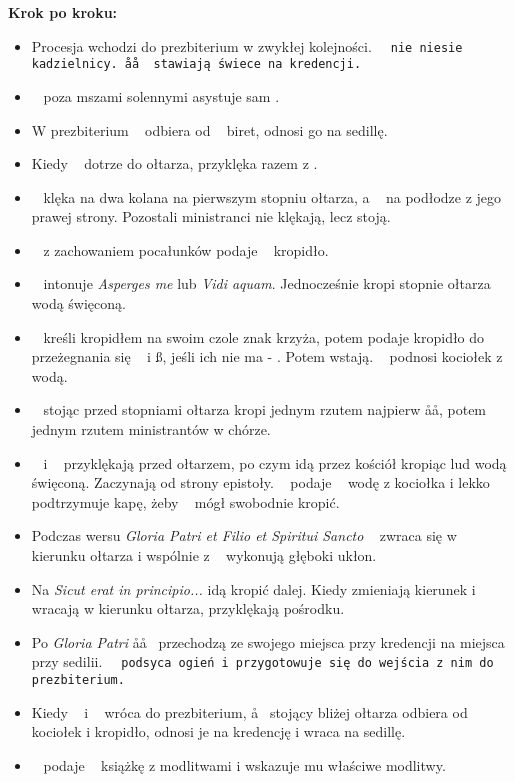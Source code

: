 \textbf{Krok po kroku:}
\begin{itemize}
	\item Procesja wchodzi do prezbiterium w zwykłej kolejności. \tt~ nie niesie
	      kadzielnicy. \aa\aa~ stawiają świece na kredencji.
	\item \ii~ poza mszami solennymi asystuje sam \cc.
	\item W prezbiterium \cc~ odbiera od \ii~ biret, odnosi go na sedillę.
	\item Kiedy \ii~ dotrze do ołtarza, przyklęka razem z \cc.
	\item \ii~ klęka na dwa kolana na pierwszym stopniu ołtarza, a \cc~ na
	      podłodze z jego prawej strony. Pozostali ministranci nie klękają, lecz
	      stoją.
	\item \cc~ z zachowaniem pocałunków podaje \ii~ kropidło.
	\item \ii~ intonuje \textit{Asperges me} lub \textit{Vidi aquam}.
	      Jednocześnie kropi stopnie ołtarza wodą święconą.
	\item \ii~ kreśli kropidłem na swoim czole znak krzyża, potem podaje
	      kropidło do przeżegnania się \dd~ i \ss, jeśli ich nie ma - \cc. Potem
	      wstają. \cc~ podnosi kociołek z wodą.
	\item \ii~ stojąc przed stopniami ołtarza kropi jednym rzutem najpierw
	      \aa\aa, potem jednym rzutem ministrantów w chórze.
	\item \ii~ i \cc~ przyklękają przed ołtarzem, po czym idą przez kościół
	      kropiąc lud wodą święconą. Zaczynają od strony epistoły. \cc~ podaje
	      \ii~ wodę z kociołka i lekko podtrzymuje kapę, żeby \ii~ mógł
	      swobodnie kropić.
	\item Podczas wersu \textit{Gloria Patri et Filio et Spiritui Sancto} \ii~
	      zwraca się w kierunku ołtarza i wspólnie z \cc~ wykonują głęboki
	      ukłon.
	\item Na \textit{Sicut erat in principio...} idą kropić dalej. Kiedy
	      zmieniają kierunek i wracają w kierunku ołtarza, przyklękają pośrodku.
	\item Po \textit{Gloria Patri} \aa\aa~ przechodzą ze swojego miejsca przy
	      kredencji na miejsca przy sedilii. \tt~ podsyca ogień i przygotowuje
	      się do wejścia z nim do prezbiterium.
	\item Kiedy \ii~ i \cc~ wróca do prezbiterium, \aa~ stojący bliżej ołtarza
	      odbiera od \cc~ kociołek i kropidło, odnosi je na kredencję i wraca na
	      sedillę.
	\item \cc~ podaje \ii~ książkę z modlitwami i wskazuje mu właściwe modlitwy.

\end{itemize}
